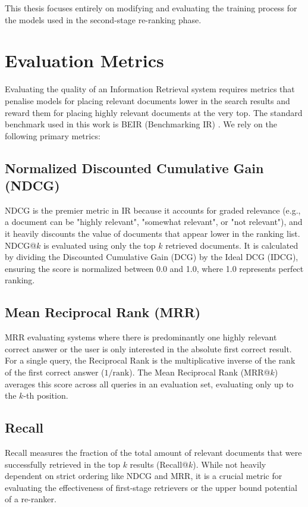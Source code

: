 This thesis focuses entirely on modifying and evaluating the training process for the models used in the second-stage re-ranking phase.

\section{Evaluation Metrics}
\label{sec:background_metrics}

Evaluating the quality of an Information Retrieval system requires metrics that penalise models for placing relevant documents lower in the search results and reward them for placing highly relevant documents at the very top. The standard benchmark used in this work is BEIR (Benchmarking IR) \cite{thakur2021beir}. We rely on the following primary metrics:

\subsection{Normalized Discounted Cumulative Gain (NDCG)}
NDCG is the premier metric in IR because it accounts for graded relevance (e.g., a document can be "highly relevant", "somewhat relevant", or "not relevant"), and it heavily discounts the value of documents that appear lower in the ranking list. NDCG@$k$ is evaluated using only the top $k$ retrieved documents. It is calculated by dividing the Discounted Cumulative Gain (DCG) by the Ideal DCG (IDCG), ensuring the score is normalized between 0.0 and 1.0, where 1.0 represents perfect ranking.

\subsection{Mean Reciprocal Rank (MRR)}
MRR evaluating systems where there is predominantly one highly relevant correct answer or the user is only interested in the absolute first correct result. For a single query, the Reciprocal Rank is the multiplicative inverse of the rank of the first correct answer ($1/\text{rank}$). The Mean Reciprocal Rank (MRR@$k$) averages this score across all queries in an evaluation set, evaluating only up to the $k$-th position.

\subsection{Recall}
Recall measures the fraction of the total amount of relevant documents that were successfully retrieved in the top $k$ results (Recall@$k$). While not heavily dependent on strict ordering like NDCG and MRR, it is a crucial metric for evaluating the effectiveness of first-stage retrievers or the upper bound potential of a re-ranker.

